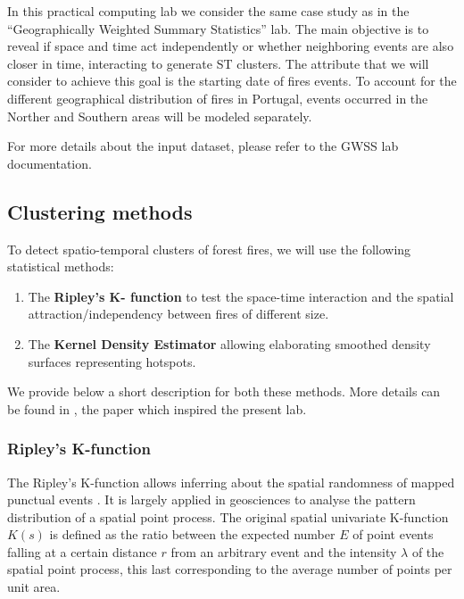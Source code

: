 \documentclass[
]{article}
\begin{document}
In this practical computing lab we consider the same case study as in the ``Geographically Weighted Summary Statistics'' lab.
The main objective is to reveal if space and time act independently or whether neighboring events are also closer in time, interacting to generate ST clusters.
The attribute that we will consider to achieve this goal is the starting date of fires events.
To account for the different geographical distribution of fires in Portugal, events occurred in the Norther and Southern areas will be modeled separately.

For more details about the input dataset, please refer to the GWSS lab documentation.

\subsection{Clustering methods}\label{clustering-methods}

To detect spatio-temporal clusters of forest fires, we will use the following statistical methods:

\begin{enumerate}
\def\labelenumi{(\arabic{enumi})}
\item
  The \textbf{Ripley's K- function} to test the space-time interaction and the spatial attraction/independency between fires of different size.
\item
  The \textbf{Kernel Density Estimator} allowing elaborating smoothed density surfaces representing hotspots.
\end{enumerate}

We provide below a short description for both these methods.
More details can be found in \citep{tonini_evolution_2017}, the paper which inspired the present lab.

\subsubsection{Ripley's K-function}\label{ripleys-k-function}

The Ripley's K-function allows inferring about the spatial randomness of mapped punctual events \citep{ripley1977modelling}.
It is largely applied in geosciences to analyse the pattern distribution of a spatial point process.
The original spatial univariate K-function \(K(s)\) is defined as the ratio between the expected number \(E\) of point events falling at a certain distance \(r\) from an arbitrary event and the intensity \(\lambda\) of the spatial point process, this last corresponding to the average number of points per unit area.
\end{document}
